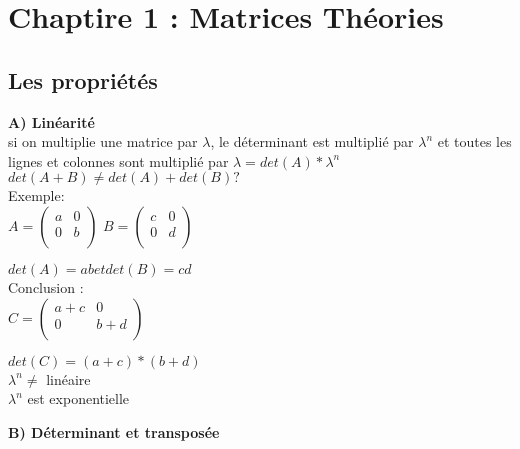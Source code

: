 
\newpage
\chapter{Chaptire 1 : Matrices Théories}
\section{Les propriétés}
\vspace{3mm} %

\textbf{A) Linéarité }\\

si on multiplie une matrice par $\lambda$, le déterminant est multiplié par $\lambda^{n}$ et toutes les lignes et colonnes sont multiplié par $\lambda=det(A)*\lambda^{n}$ \\

$det(A+B) \neq det(A)+det(B) ?$ \\

Exemple:\\

$
A =
\begin{pmatrix}
  a & 0 \\
  0 & b \\
\end{pmatrix}
$
\vspace{3mm} %
$
B =
\begin{pmatrix}
  c & 0 \\
  0 & d \\
\end{pmatrix}
$

$det(A)=ab et det(B)=cd $ \\

Conclusion : \\

$
C =
\begin{pmatrix}
  a+c & 0 \\
  0 & b+d \\
\end{pmatrix}
$

\vspace{3mm} %
$det(C)=(a+c)*(b+d)$ \\


\vspace{3mm} %
$\lambda^{n} \neq$ linéaire \\
$\lambda^{n}$ est exponentielle

\vspace{6mm} %
\textbf{B) Déterminant et transposée} \\

